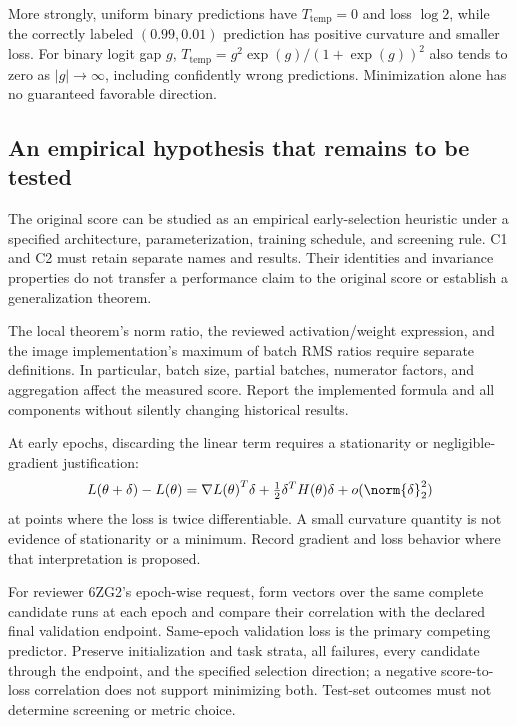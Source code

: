 More strongly, uniform binary predictions have $T_{\mathrm{temp}}=0$ and loss $\log 2$, while the correctly labeled $(0.99,0.01)$ prediction has positive curvature and smaller loss. For binary logit gap $g$, $T_{\mathrm{temp}}=g^2\exp(g)/{(1+\exp(g))}^2$ also tends to zero as $|g|\to\infty$, including confidently wrong predictions. Minimization alone has no guaranteed favorable direction.

\subsection{An empirical hypothesis that remains to be tested}

The original score can be studied as an empirical early-selection heuristic under a specified architecture, parameterization, training schedule, and screening rule. C1 and C2 must retain separate names and results. Their identities and invariance properties do not transfer a performance claim to the original score or establish a generalization theorem.

The local theorem's norm ratio, the reviewed activation/weight expression, and the image implementation's maximum of batch RMS ratios require separate definitions. In particular, batch size, partial batches, numerator factors, and aggregation affect the measured score. Report the implemented formula and all components without silently changing historical results.

At early epochs, discarding the linear term requires a stationarity or negligible-gradient justification:
\begin{equation}
    L(\theta+\delta)-L(\theta)={\nabla L(\theta)}^T\delta
    +\tfrac{1}{2}\delta^T H(\theta)\delta+o(\norm{\delta}_2^2)
\end{equation}
at points where the loss is twice differentiable. A small curvature quantity is not evidence of stationarity or a minimum. Record gradient and loss behavior where that interpretation is proposed.

For reviewer 6ZG2's epoch-wise request, form vectors over the same complete candidate runs at each epoch and compare their correlation with the declared final validation endpoint. Same-epoch validation loss is the primary competing predictor. Preserve initialization and task strata, all failures, every candidate through the endpoint, and the specified selection direction; a negative score-to-loss correlation does not support minimizing both. Test-set outcomes must not determine screening or metric choice.

